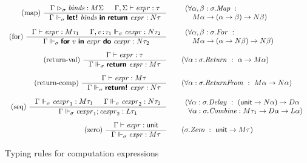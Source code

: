 \documentclass[runningheads,a4paper]{llncs}
\begin{document}
\begin{figure}[t!]
\begin{equation*}
\begin{array}{rl}
\begin{array}{l}
\end{array}
\\[1.5em]
(\textnormal{map})~
\inference
  { \Gamma \bvdash \binds : \mtyp\Sigma &
    \Gamma, \Sigma \vdash \expr : \tau }
  { \Gamma \cvdash \kvd{let!}~\binds~\kvd{in}~\kvd{return}~\expr : \ntyp{\tau}  }
&\quad\begin{array}{l}
(\forall\alpha,\beta: \sigma.\plc{Map}~:\\
\quad \mtyp{\alpha} \rightarrow (\alpha \rightarrow \beta) \rightarrow \ntyp{\beta} )  
\end{array}
\\[1.5em]
(\textnormal{for})~
\inference
  { \Gamma \vdash \expr : \mtyp{\tau_1} &
    \Gamma, \tya{v}{\tau_1} \cvdash \cexpr : \ntyp{\tau_2} }
  { \Gamma \cvdash \kvd{for}~v~\kvd{in}~\expr~\kvd{do}~\cexpr : \ntyp{\tau_2}  }
&\quad\begin{array}{l}
(\forall\alpha,\beta: \sigma.\plc{For}~:\\
\quad \mtyp{\alpha} \rightarrow (\alpha \rightarrow \ntyp{\beta}) \rightarrow \ntyp{\beta} )  
\end{array}
\\[1.5em]
(\textnormal{return-val})~
\inference
  { \Gamma \vdash \expr : \tau }
  { \Gamma \cvdash \kvd{return}~\expr : \mtyp{\tau}  }
&\quad(\forall\alpha: \sigma.\plc{Return}~:~\alpha \rightarrow \mtyp{\alpha})
\\[1.5em]
(\textnormal{return-comp})~
\inference
  { \Gamma \vdash \expr : \mtyp \tau }
  { \Gamma \cvdash \kvd{return!}~\expr : \ntyp{\tau}  }
&\quad(\forall\alpha: \sigma.\plc{ReturnFrom}~:~\mtyp{\alpha} \rightarrow \ntyp{\alpha})  
\\[1.5em]
(\textnormal{seq})~
\inference
  { \Gamma \cvdash \cexpr_1 : \mtyp{\tau_1}  &  \Gamma \cvdash \cexpr_2 : \ntyp{\tau_2}}
  { \Gamma \cvdash \cexpr_1; \cexpr_2 : \ltyp{\tau_1}  }
&\quad\begin{array}{l}
(\forall\alpha: \sigma.\plc{Delay} ~:~ (\unit \rightarrow \ntyp{\alpha}) \rightarrow \dtyp{\alpha} \\
\;\,\forall\alpha: \sigma.\plc{Combine} : \mtyp{\tau_1} \rightarrow \dtyp{\alpha} \rightarrow \ltyp{\alpha} )
\end{array}
\\[1.5em]
(\textnormal{zero})~
\inference
  { \Gamma \vdash \expr : \unit }
  { \Gamma \cvdash \expr : \mtyp{\tau}  }
&\quad(\sigma.\plc{Zero}~:~\unit \rightarrow \mtyp{\tau})
\end{array}
\end{equation*}
\vspace{-1em}
\caption{Typing rules for computation expressions}
\label{fig:typing}
\vspace{-1em}
\end{figure}
\end{document}
